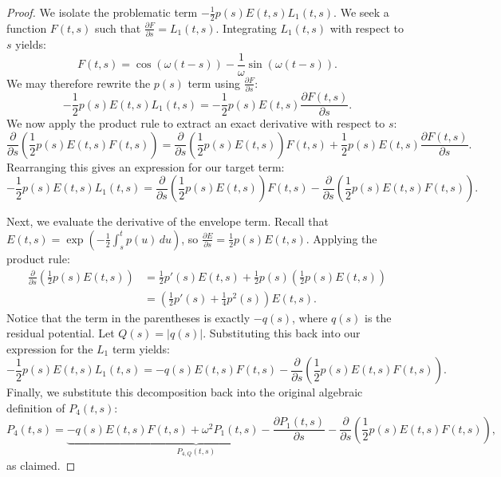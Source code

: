 \documentclass[10pt,reqno]{amsart}
\theoremstyle{definition}
\begin{document}
	\begin{proof}
		We isolate the problematic term $-\frac{1}{2}p(s)E(t, s)L_1(t, s)$. We seek a function $F(t, s)$ such that $\frac{\partial F}{\partial s} = L_1(t, s)$. 
		Integrating $L_1(t, s)$ with respect to $s$ yields:
		\[ F(t, s) = \cos(\omega(t-s)) - \frac{1}{\omega} \sin(\omega(t-s)). \]
		We may therefore rewrite the $p(s)$ term using $\frac{\partial F}{\partial s}$:
		\[ -\frac{1}{2}p(s)E(t, s)L_1(t, s) = -\frac{1}{2}p(s)E(t, s) \frac{\partial F(t, s)}{\partial s}. \]
		We now apply the product rule to extract an exact derivative with respect to $s$:
		\[ \frac{\partial}{\partial s} \left( \frac{1}{2}p(s) E(t, s) F(t, s) \right) = \frac{\partial}{\partial s} \left( \frac{1}{2}p(s) E(t, s) \right) F(t, s) + \frac{1}{2}p(s) E(t, s) \frac{\partial F(t, s)}{\partial s}. \]
		Rearranging this gives an expression for our target term:
		\[ -\frac{1}{2}p(s)E(t, s)L_1(t, s) = \frac{\partial}{\partial s} \left( \frac{1}{2}p(s) E(t, s) \right) F(t, s) - \frac{\partial}{\partial s} \left( \frac{1}{2}p(s) E(t, s) F(t, s) \right). \]
		
		Next, we evaluate the derivative of the envelope term. Recall that $E(t, s) = \exp\left(-\frac{1}{2}\int_s^t p(u)\,du\right)$, so $\frac{\partial E}{\partial s} = \frac{1}{2}p(s)E(t, s)$. Applying the product rule:
		\begin{align*}
			\frac{\partial}{\partial s} \left( \frac{1}{2}p(s) E(t, s) \right) &= \frac{1}{2}p'(s) E(t, s) + \frac{1}{2}p(s) \left( \frac{1}{2}p(s) E(t, s) \right) \\
			&= \left( \frac{1}{2}p'(s) + \frac{1}{4}p^2(s) \right) E(t, s).
		\end{align*}
		Notice that the term in the parentheses is exactly $-q(s)$, where $q(s)$ is the residual potential. Let $Q(s) = |q(s)|$.
		Substituting this back into our expression for the $L_1$ term yields:
		\[ -\frac{1}{2}p(s)E(t, s)L_1(t, s) = -q(s) E(t, s) F(t, s) - \frac{\partial}{\partial s} \left( \frac{1}{2}p(s) E(t, s) F(t, s) \right). \]
		Finally, we substitute this decomposition back into the original algebraic definition of $P_4(t, s)$:
		\[ P_4(t, s) = \underbrace{ -q(s) E(t, s) F(t, s) + \omega^2 P_1(t, s) - \frac{\partial P_1(t, s)}{\partial s} }_{P_{4, Q}(t, s)} - \frac{\partial}{\partial s} \left( \frac{1}{2}p(s) E(t, s) F(t, s) \right),\]
		as claimed.
	\end{proof}
	
\end{document}
